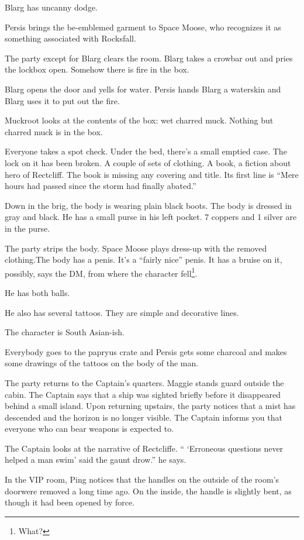 \documentclass{article}
\begin{document}
Blarg has uncanny dodge.

Persis brings the be-emblemed garment to Space Moose, who recognizes it as something associated with Rocksfall.

The party except for Blarg clears the room. Blarg takes a crowbar out and pries the lockbox open. Somehow there is fire in the box.

Blarg opens the door and yells for water. Persis hands Blarg a waterskin and Blarg uses it to put out the fire.

Muckroot looks at the contents of the box: wet charred muck. Nothing but charred muck is in the box.

Everyone takes a spot check. Under the bed, there's a small emptied case. The lock on it has been broken. A couple of sets of clothing. A book, a fiction about hero of Rectcliff. The book is missing any covering and title. Its first line is ``Mere hours had passed since the storm had finally abated.''

Down in the brig, the body is wearing plain black boots. The body is dressed in gray and black. He has a small purse in his left pocket. 7 coppers and 1 silver are in the purse.

The party strips the body. Space Moose plays dress-up with the removed clothing.The body has a penis. It's a ``fairly nice'' penis. It has a bruise on it, possibly, says the DM, from where the character fell\footnote{What?}.

He has both balls.

He also has several tattoos. They are simple and decorative lines.

The character is South Asian-ish.

Everybody goes to the papryus crate and Persis gets some charcoal and makes some drawings of the tattoos on the body of the man.

The party returns to the Captain's quarters. Maggie stands guard outside the cabin. The Captain says that a ship was sighted briefly before it disappeared behind a small island. Upon returning upstairs, the party notices that a mist has descended and the horizon is no longer visible. The Captain informs you that everyone who can bear weapons is expected to. 

The Captain looks at the narrative of Rectcliffe. `` `Erroneous questions never helped a man swim' said the gaunt drow.'' he says.

In the VIP room, Ping notices that the handles on the outside of the room's doorwere removed a long time ago. On the inside, the handle is slightly bent, as though it had been opened by force.
\end{document}
